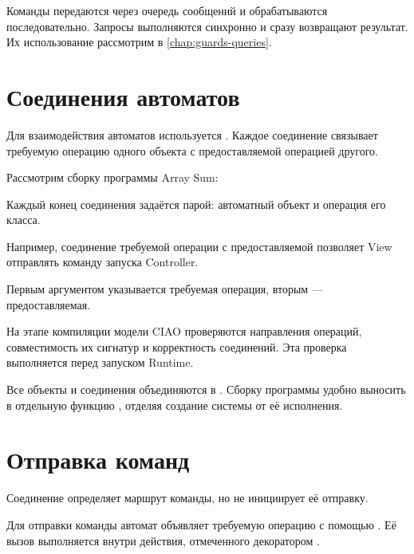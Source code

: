 Команды передаются через очередь сообщений и
обрабатываются последовательно. Запросы выполняются
синхронно и сразу возвращают результат.
Их использование рассмотрим в
\cref{chap:guards-queries}.

\section{Соединения автоматов}

Для взаимодействия автоматов используется
. Каждое соединение связывает
требуемую операцию одного объекта с предоставляемой
операцией другого.

Рассмотрим сборку программы Array Sum:



Каждый конец соединения задаётся парой:
автоматный объект и операция его класса.

Например, соединение требуемой операции
 с предоставляемой
 позволяет View отправлять
команду запуска Controller.

\noindent\begin{minipage}{\textwidth}
  \centering
  
  \label{fig:sum-start-connection}

  \vspace{0.4em}  
\end{minipage}

Первым аргументом  указывается
требуемая операция, вторым --- предоставляемая.

На этапе компиляции модели CIAO проверяются
направления операций, совместимость их сигнатур
и корректность соединений. Эта проверка выполняется
перед запуском Runtime.

Все объекты и соединения объединяются в .
Сборку программы удобно выносить в отдельную функцию
, отделяя создание системы
от её исполнения.

\section{Отправка команд}

Соединение определяет маршрут команды, но не
инициирует её отправку.

Для отправки команды автомат объявляет требуемую
операцию с помощью .
Её вызов выполняется внутри действия, отмеченного
декоратором .


